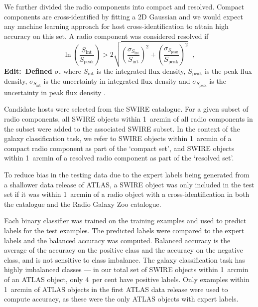 \documentclass[fleqn,usenatbib,usedcolumn]{mnras}
\newcommand{\edit}[1]{{\bf Edit:~{#1}}}
\begin{document}
    We further divided the radio components into compact and resolved. Compact
    components are cross-identified by fitting a 2D Gaussian \citep[as
    in][]{norris06} and we would expect any machine learning approach for host
    cross-identification to attain high accuracy on this set. A radio component was
    considered resolved if
    \begin{equation}
        \ln \left(
          \frac{S_{\text{int}}}
               {S_{\text{peak}}}
        \right) > 2\sqrt{\left(
          \frac{\sigma_{S_{\text{int}}}}
               {S_{\text{int}}}
        \right)^2 + \left(
          \frac{\sigma_{S_{\text{peak}}}}
               {S_{\text{peak}}}
        \right)^2}\,\,\,\,,
    \end{equation}%
    \edit{Defined $\sigma$.} where \(S_{\text{int}}\) is the integrated flux density, \(S_{\text{peak}}\) is the peak flux density, $\sigma_{S_{\text{int}}}$ is the uncertainty in integrated flux density and $\sigma_{S_{\text{peak}}}$ is the uncertainty in peak flux density \citep[following][]{franzen15}.

    Candidate hosts were selected from the SWIRE catalogue. For a given subset
    of radio components, all SWIRE objects within 1~arcmin of all radio
    components in the subset were added to the associated SWIRE subset. In the
    context of the galaxy classification task, we refer to SWIRE objects
    within 1~arcmin of a compact radio component as part of the `compact set',
    and SWIRE objects within 1~arcmin of a resolved radio component as part of
    the `resolved set'.

    To reduce
    bias in the testing data due to the expert labels being generated from a
    shallower data release of ATLAS, a SWIRE object was only included in the test
    set if it was within 1~arcmin of a radio object with a cross-identification
    in both the \citet{norris06} catalogue and the Radio Galaxy Zoo catalogue.

    Each binary classifier was trained on the training examples and used to predict labels for the test examples. The predicted labels were compared to the expert labels and the balanced accuracy was computed. Balanced accuracy is the average of the accuracy on the positive class and the accuracy on the negative class, and is not sensitive to class imbalance. The galaxy classification task has highly imbalanced classes --- in our total set of SWIRE objects within 1~arcmin of an ATLAS object, only 4~per cent have positive labels. Only examples within 1~arcmin of ATLAS objects in the first ATLAS data release \citep{norris06} were used to compute accuracy, as these were the only ATLAS objects with expert labels.
\end{document}

